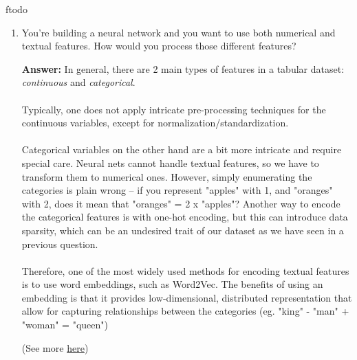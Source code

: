 ƒtodo\documentclass{article}
\newenvironment{QandA}{\begin{enumerate}[label=\arabic*.]}{\end{enumerate}}
\newenvironment{answer}{\par\normalfont \textbf{Answer:}}{}
\begin{document}
\begin{QandA}
    \item You’re building a neural network and you want to use both numerical and textual features. How would you process those different features?
    \begin{answer}
        In general, there are 2 main types of features in a tabular dataset: \textit{continuous} and \textit{categorical}. \\\\
        Typically, one does not apply intricate pre-processing techniques for the continuous variables, except for normalization/standardization. \\\\
        Categorical variables on the other hand are a bit more intricate and require special care. Neural nets cannot handle textual features, so we have to transform them to numerical ones. However, simply enumerating the categories is plain wrong -- if you represent "apples" with 1, and "oranges" with 2, does it mean that "oranges" = 2 x "apples"? Another way to encode the categorical features is with one-hot encoding, but this can introduce data sparsity, which can be an undesired trait of our dataset as we have seen in a previous question. \\\\
        Therefore, one of the most widely used methods for encoding textual features is to use word embeddings, such as Word2Vec. The benefits of using an embedding is that it provides low-dimensional, distributed representation that allow for capturing relationships between the categories (eg. "king" - "man" + "woman" = "queen")

        (See more \href{https://www.fast.ai/2018/04/29/categorical-embeddings/}{here})
    \end{answer}


\end{QandA}
\end{document}
